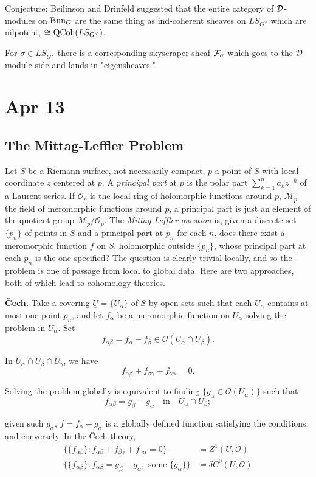 \documentclass[12pt]{article}
\begin{document}
Conjecture: Beilinson and Drinfeld suggested that the entire category of ${\mathcal{D}}$-modules on $\operatorname{Bun}_G$ are the same thing as ind-coherent sheaves on $LS_{G^\vee}$ which are nilpotent, $\cong \operatorname{QCoh}(LS_{G^\vee})$.

For $\sigma \in LS_{G^\vee}$ there is a corresponding skyscraper sheaf ${\mathcal{F}}_\sigma$ which goes to the ${\mathcal{D}}$-module side and lands in "eigensheaves."

\section{Apr 13}

\subsection{The Mittag-Leffler Problem}

Let $S$ be a Riemann surface, not necessarily compact, $p$ a point of $S$ with local coordinate $z$ centered at $p$. A \emph{principal part} at $p$ is the polar part $\sum_{k=1}^{n} a_k z^{-k}$ of a Laurent series. If $\mathcal{O}_p$ is the local ring of holomorphic functions around $p$, $\mathcal{M}_p$ the field of meromorphic functions around $p$, a principal part is just an element of the quotient group $\mathcal{M}_p/\mathcal{O}_p$. The \emph{Mittag-Leffler question} is, given a discrete set $\{p_n\}$ of points in $S$ and a principal part at $p_n$ for each $n$, does there exist a meromorphic function $f$ on $S$, holomorphic outside $\{p_n\}$, whose principal part at each $p_n$ is the one specified? The question is clearly trivial locally, and so the problem is one of passage from local to global data. Here are two approaches, both of which lead to cohomology theories.

\textbf{\v{C}ech.} Take a covering $\underline{U} = \{U_\alpha\}$ of $S$ by open sets such that each $U_\alpha$ contains at most one point $p_n$, and let $f_\alpha$ be a meromorphic function on $U_\alpha$ solving the problem in $U_\alpha$. Set
\[
f_{\alpha\beta} = f_\alpha - f_\beta \in \mathcal{O}(U_\alpha \cap U_\beta).
\]

In $U_\alpha \cap U_\beta \cap U_\gamma$, we have
\[
f_{\alpha\beta} + f_{\beta\gamma} + f_{\gamma\alpha} = 0.
\]

Solving the problem globally is equivalent to finding $\{g_\alpha \in \mathcal{O}(U_\alpha)\}$ such that
\[
f_{\alpha\beta} = g_\beta - g_\alpha \quad \text{in} \quad U_\alpha \cap U_\beta;
\]

given such $g_\alpha$, $f = f_\alpha + g_\alpha$ is a globally defined function satisfying the conditions, and conversely. In the \v{C}ech theory,
\begin{align*}
\{\{f_{\alpha\beta}\} : f_{\alpha\beta} + f_{\beta\gamma} + f_{\gamma\alpha} = 0\} &= Z^1(\underline{U}, \mathcal{O}) \\
\{\{f_{\alpha\beta}\} : f_{\alpha\beta} = g_\beta - g_\alpha, \text{ some } \{g_\alpha\}\} &= \delta C^0(\underline{U}, \mathcal{O})
\end{align*}
\end{document}
